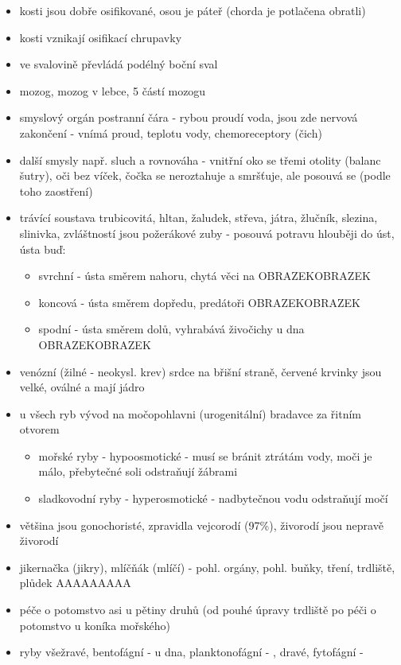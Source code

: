 \documentclass{article}
\begin{document}
\begin{itemize}
  \item kosti jsou dobře osifikované, osou je páteř (chorda je potlačena obratli)
  \item kosti vznikají osifikací chrupavky
  \item ve svalovině převládá podélný boční sval
  \item mozog, mozog v lebce, 5 částí mozogu
  \item smyslový orgán postranní čára - rybou proudí voda, jsou zde nervová zakončení - vnímá proud, teplotu vody, chemoreceptory (čich)
  \item další smysly např. sluch a rovnováha - vnitřní oko se třemi otolity (balanc šutry), oči bez víček, čočka se neroztahuje a smršťuje, ale posouvá se (podle toho zaostření)
  \item trávící soustava trubicovitá, hltan, žaludek, střeva, játra, žlučník, slezina, slinivka, zvláštností jsou požerákové zuby - posouvá potravu hlouběji do úst, ústa buď:
  \begin{itemize}
    \item svrchní - ústa směrem nahoru, chytá věci na  OBRAZEKOBRAZEK
    \item koncová - ústa směrem dopředu, predátoři OBRAZEKOBRAZEK
    \item spodní - ústa směrem dolů, vyhrabává živočichy u dna OBRAZEKOBRAZEK
  \end{itemize}
  \item venózní (žilné - neokysl. krev) srdce na břišní straně, červené krvinky jsou velké, oválné a mají jádro
  \item u všech ryb vývod na močopohlavni (urogenitální) bradavce za řitním otvorem
  \begin{itemize}
    \item mořské ryby - hypoosmotické - musí se bránit ztrátám vody, moči je málo, přebytečné soli odstraňují žábrami
    \item sladkovodní ryby - hyperosmotické - nadbytečnou vodu odstraňují močí
  \end{itemize}
  \item většina jsou gonochoristé, zpravidla vejcorodí (97\%), živorodí jsou nepravě živorodí
  \item jikernačka (jikry), mlíčňák (mlíčí) - pohl. orgány, pohl. buňky, tření, trdliště, plůdek AAAAAAAAA
  \item péče o potomstvo asi u pětiny druhů (od pouhé úpravy trdliště po péči o potomstvo u koníka mořského)
  \item ryby všežravé, bentofágní - u dna, planktonofágní -  , dravé, fytofágní - 

\end{itemize}
\end{document}
